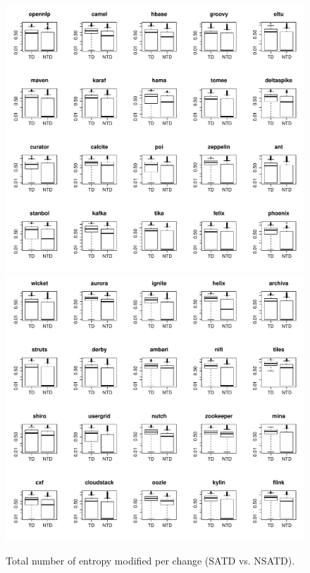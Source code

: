 \begin{figure}[tb]
	\centering
	\includegraphics[width=120mm]{figures/chapter4/rq3_td_entropy_logged_1}
	\includegraphics[width=120mm]{figures/chapter4/rq3_td_entropy_logged_2}
	\caption{Total number of entropy modified per change (SATD vs. NSATD).}
	\label{figure:total_entropy_td_vs_ntd}
\end{figure}


